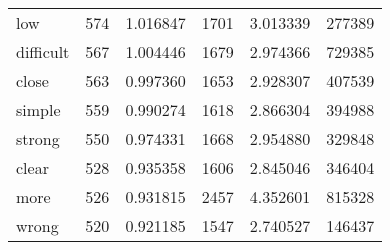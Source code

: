 \begin{table}[ht]
\begin{tabular}{lrrrrr}
low & {\cellcolor[HTML]{C5E9E2}} \color[HTML]{000000} 574 & {\cellcolor[HTML]{C5E9E2}} \color[HTML]{000000} 1.016847 & {\cellcolor[HTML]{DCF2F2}} \color[HTML]{000000} 1701 & {\cellcolor[HTML]{DCF2F2}} \color[HTML]{000000} 3.013339 & {\cellcolor[HTML]{E9F7FA}} \color[HTML]{000000} 277389 \\
difficult & {\cellcolor[HTML]{CDECE6}} \color[HTML]{000000} 567 & {\cellcolor[HTML]{CDECE6}} \color[HTML]{000000} 1.004446 & {\cellcolor[HTML]{DEF2F4}} \color[HTML]{000000} 1679 & {\cellcolor[HTML]{DEF2F4}} \color[HTML]{000000} 2.974366 & {\cellcolor[HTML]{A8DED2}} \color[HTML]{000000} 729385 \\
close & {\cellcolor[HTML]{CEEDE8}} \color[HTML]{000000} 563 & {\cellcolor[HTML]{CEEDE8}} \color[HTML]{000000} 0.997360 & {\cellcolor[HTML]{E1F4F6}} \color[HTML]{000000} 1653 & {\cellcolor[HTML]{E1F4F6}} \color[HTML]{000000} 2.928307 & {\cellcolor[HTML]{DCF2F2}} \color[HTML]{000000} 407539 \\
simple & {\cellcolor[HTML]{D1EEE9}} \color[HTML]{000000} 559 & {\cellcolor[HTML]{D1EEE9}} \color[HTML]{000000} 0.990274 & {\cellcolor[HTML]{E4F5F8}} \color[HTML]{000000} 1618 & {\cellcolor[HTML]{E4F5F8}} \color[HTML]{000000} 2.866304 & {\cellcolor[HTML]{DEF2F4}} \color[HTML]{000000} 394988 \\
strong & {\cellcolor[HTML]{D5EFED}} \color[HTML]{000000} 550 & {\cellcolor[HTML]{D5EFED}} \color[HTML]{000000} 0.974331 & {\cellcolor[HTML]{DFF3F5}} \color[HTML]{000000} 1668 & {\cellcolor[HTML]{DFF3F5}} \color[HTML]{000000} 2.954880 & {\cellcolor[HTML]{E5F5F9}} \color[HTML]{000000} 329848 \\
clear & {\cellcolor[HTML]{E0F3F5}} \color[HTML]{000000} 528 & {\cellcolor[HTML]{E0F3F5}} \color[HTML]{000000} 0.935358 & {\cellcolor[HTML]{E5F5F9}} \color[HTML]{000000} 1606 & {\cellcolor[HTML]{E5F5F9}} \color[HTML]{000000} 2.845046 & {\cellcolor[HTML]{E3F4F7}} \color[HTML]{000000} 346404 \\
more & {\cellcolor[HTML]{E1F4F6}} \color[HTML]{000000} 526 & {\cellcolor[HTML]{E1F4F6}} \color[HTML]{000000} 0.931815 & {\cellcolor[HTML]{5CBD98}} \color[HTML]{F1F1F1} 2457 & {\cellcolor[HTML]{5CBD98}} \color[HTML]{F1F1F1} 4.352601 & {\cellcolor[HTML]{97D7C7}} \color[HTML]{000000} 815328 \\
wrong & {\cellcolor[HTML]{E4F5F8}} \color[HTML]{000000} 520 & {\cellcolor[HTML]{E4F5F8}} \color[HTML]{000000} 0.921185 & {\cellcolor[HTML]{E9F7FA}} \color[HTML]{000000} 1547 & {\cellcolor[HTML]{E9F7FA}} \color[HTML]{000000} 2.740527 & {\cellcolor[HTML]{F2FAFC}} \color[HTML]{000000} 146437 \\

\end{tabular}
\end{table}
